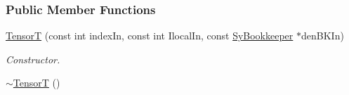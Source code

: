 \subsubsection*{Public Member Functions}
\begin{DoxyCompactItemize}
\item 
\hyperlink{classCheMPS2_1_1TensorT_a08705c000454ebea5b96a4a8a7fbdc0f}{Tensor\-T} (const int index\-In, const int Ilocal\-In, const \hyperlink{classCheMPS2_1_1SyBookkeeper}{Sy\-Bookkeeper} $\ast$den\-B\-K\-In)
\begin{DoxyCompactList}\small\item\em Constructor. \end{DoxyCompactList}\item 
\hypertarget{classCheMPS2_1_1TensorT_af4de45c3fe49b6f0cfc605c4effb5a01}{\hyperlink{classCheMPS2_1_1TensorT_af4de45c3fe49b6f0cfc605c4effb5a01}{$\sim$\-Tensor\-T} ()}\label{classCheMPS2_1_1TensorT_af4de45c3fe49b6f0cfc605c4effb5a01}


\end{DoxyCompactItemize}
